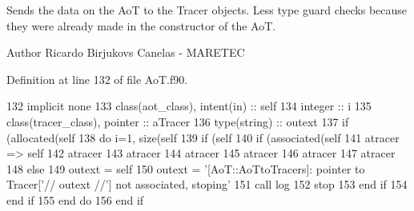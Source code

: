 Sends the data on the AoT to the Tracer objects. Less type guard checks because they were already made in the constructor of the AoT. 

\begin{DoxyAuthor}{Author}
Ricardo Birjukovs Canelas -\/ M\+A\+R\+E\+T\+EC 
\end{DoxyAuthor}


Definition at line 132 of file Ao\+T.\+f90.


\begin{DoxyCode}
132     \textcolor{keywordtype}{implicit none}
133     \textcolor{keywordtype}{class}(aot\_class), \textcolor{keywordtype}{intent(in)} :: self
134     \textcolor{keywordtype}{integer} :: i
135     \textcolor{keywordtype}{class}(tracer\_class), \textcolor{keywordtype}{pointer} :: aTracer
136     \textcolor{keywordtype}{type}(string) :: outext
137     \textcolor{keywordflow}{if} (\textcolor{keyword}{allocated}(self%
138         \textcolor{keywordflow}{do} i=1, \textcolor{keyword}{size}(self%
139             \textcolor{keywordflow}{if} (self%
140                 \textcolor{keywordflow}{if} (\textcolor{keyword}{associated}(self%
141                     atracer => self%
142                     atracer%
143                     atracer%
144                     atracer%
145                     atracer%
146                     atracer%
147                     atracer%
148                 \textcolor{keywordflow}{else}
149                     outext = self%
150                     outext = \textcolor{stringliteral}{'[AoT::AoTtoTracers]: pointer to Tracer['}// outext //\textcolor{stringliteral}{'] not associated,
       stoping'}
151                     \textcolor{keyword}{call }log%
152                     stop
153 \textcolor{keywordflow}{                end if}
154 \textcolor{keywordflow}{            end if}
155 \textcolor{keywordflow}{        end do}
156 \textcolor{keywordflow}{    end if}
\end{DoxyCode}
